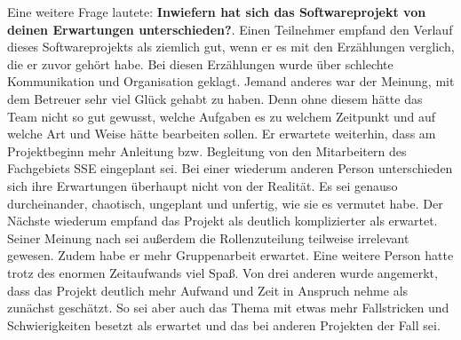 \documentclass[../review_3.tex]{subfiles}
\begin{document}
Eine weitere Frage lautete: \glqq \textbf{Inwiefern hat sich das Softwareprojekt von deinen Erwartungen unterschieden?}\grqq{}.
Einen Teilnehmer empfand den Verlauf dieses Softwareprojekts als ziemlich gut, wenn er es mit den Erzählungen verglich, die er zuvor gehört habe. Bei diesen Erzählungen wurde über schlechte Kommunikation und Organisation geklagt. Jemand anderes war der Meinung, mit dem Betreuer sehr viel Glück gehabt zu haben. Denn ohne diesem hätte das Team nicht so gut gewusst, welche Aufgaben es zu welchem Zeitpunkt und auf welche Art und Weise hätte bearbeiten sollen. Er erwartete weiterhin, dass am Projektbeginn mehr Anleitung bzw. Begleitung von den Mitarbeitern des Fachgebiets SSE eingeplant sei. Bei einer wiederum anderen Person unterschieden sich ihre Erwartungen überhaupt nicht von der Realität. Es sei genauso durcheinander, chaotisch, ungeplant und unfertig, wie sie es vermutet habe. Der Nächste wiederum empfand das Projekt als deutlich komplizierter als erwartet. Seiner Meinung nach sei außerdem die Rollenzuteilung teilweise irrelevant gewesen. Zudem habe er mehr Gruppenarbeit erwartet. Eine weitere Person hatte trotz des enormen Zeitaufwands viel Spaß. Von drei anderen wurde angemerkt, dass das Projekt deutlich mehr Aufwand und Zeit in Anspruch nehme als zunächst geschätzt. So sei aber auch das Thema mit etwas mehr Fallstricken und Schwierigkeiten besetzt als erwartet und das bei anderen Projekten der Fall sei.
\end{document}
